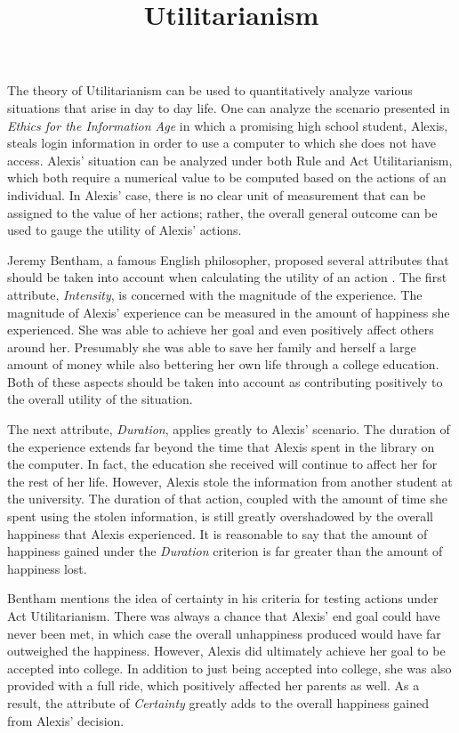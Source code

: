 \documentclass{paper}
\title{Utilitarianism}
\begin{document}
 \finalh{} \inlinetitle \begin{linenumbers}

The theory of Utilitarianism can be used to quantitatively analyze various situations that arise in
day to day life. One can analyze the scenario presented in \textit{Ethics for the Information Age}
in which a promising high school student, Alexis, steals login information in order to use a
computer to which she does not have access. Alexis' situation can be analyzed under both Rule and
Act Utilitarianism, which both require a numerical value to be computed based on the actions of an
individual. In Alexis' case, there is no clear unit of measurement that can be assigned to the value
of her actions; rather, the overall general outcome can be used to gauge the utility of Alexis'
actions.

Jeremy Bentham, a famous English philosopher, proposed several attributes that should be taken into
account when calculating the utility of an action \cite[75]{ethics}. The first attribute,
\textit{Intensity}, is concerned with the magnitude of the experience. The magnitude of Alexis'
experience can be measured in the amount of happiness she experienced. She was able to achieve her
goal and even positively affect others around her. Presumably she was able to save her family and
herself a large amount of money while also bettering her own life through a college education. Both
of these aspects should be taken into account as contributing positively to the overall utility of
the situation.

The next attribute, \textit{Duration}, applies greatly to Alexis' scenario. The duration of the
experience extends far beyond the time that Alexis spent in the library on the computer. In fact,
the education she received will continue to affect her for the rest of her life. However, Alexis
stole the information from another student at the university. The duration of that action, coupled
with the amount of time she spent using the stolen information, is still greatly overshadowed by the
overall happiness that Alexis experienced. It is reasonable to say that the amount of happiness
gained under the \textit{Duration} criterion is far greater than the amount of happiness lost.

Bentham mentions the idea of certainty in his criteria for testing actions under Act Utilitarianism.
There was always a chance that Alexis' end goal could have never been met, in which case the overall
unhappiness produced would have far outweighed the happiness. However, Alexis did ultimately achieve
her goal to be accepted into college. In addition to just being accepted into college, she was also
provided with a full ride, which positively affected her parents as well. As a result, the attribute
of \textit{Certainty} greatly adds to the overall happiness gained from Alexis' decision.


\end{linenumbers}
\end{document}
